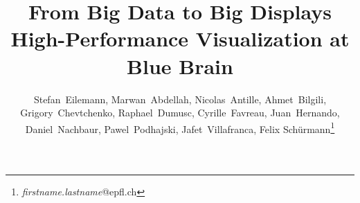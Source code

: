 \documentclass[10pt]{llncs}
\begin{document}
\lstset{language=[11]C++,basicstyle=\scriptsize,captionpos=b}
%
\title{From Big Data to Big Displays\\
High-Performance Visualization at Blue Brain}

%
%
%
%

\author{Stefan~Eilemann, Marwan~Abdellah, Nicolas~Antille, Ahmet~Bilgili, Grigory~Chevtchenko, Raphael~Dumusc, Cyrille~Favreau, Juan~Hernando, Daniel~Nachbaur, Pawel~Podhajski, Jafet~Villafranca, Felix Sch\"urmann\thanks{\textit{firstname.lastname}@epfl.ch}}

\maketitle
\end{document}
